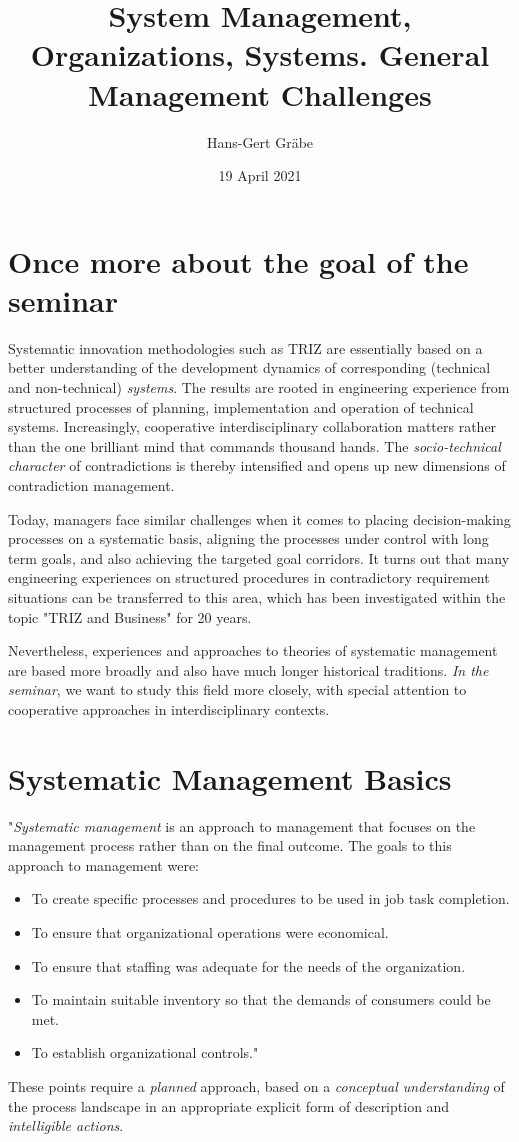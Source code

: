 \documentclass[11pt,a4paper]{article}
\title{System Management, Organizations, Systems. General Management
  Challenges}
\author{Hans-Gert Gr\"abe}
\date{19 April 2021}
\begin{document}
\maketitle

\section{Once more about the goal of the seminar}

Systematic innovation methodologies such as TRIZ are essentially based on a
better understanding of the development dynamics of corresponding (technical
and non-technical) \emph{systems}.  The results are rooted in engineering
experience from structured processes of planning, implementation and operation
of technical systems. Increasingly, cooperative interdisciplinary
collaboration matters rather than the one brilliant mind that commands
thousand hands. The \emph{socio-technical character} of contradictions is
thereby intensified and opens up new dimensions of contradiction management.

Today, managers face similar challenges when it comes to placing
decision-making processes on a systematic basis, aligning the processes under
control with long term goals, and also achieving the targeted goal corridors.
It turns out that many engineering experiences on structured procedures in
contradictory requirement situations can be transferred to this area, which
has been investigated within the topic "TRIZ and Business" for 20 years.

Nevertheless, experiences and approaches to theories of systematic management
are based more broadly and also have much longer historical traditions.
\emph{In the seminar}, we want to study this field more closely, with special
attention to cooperative approaches in interdisciplinary contexts.

\section{Systematic Management Basics}

"\emph{Systematic management} is an approach to management that focuses on the
management process rather than on the final outcome. The goals to this
approach to management were:
\begin{itemize}[noitemsep]
\item To create specific processes and procedures to be used in job task
  completion.
\item To ensure that organizational operations were economical.
\item To ensure that staffing was adequate for the needs of the organization.
\item To maintain suitable inventory so that the demands of consumers could be
  met.
\item To establish organizational controls." \cite{Hill2015}
\end{itemize}
These points require a \emph{planned} approach, based on a \emph{conceptual
  understanding} of the process landscape in an appropriate explicit form of
description and \emph{intelligible actions}.
\end{document}
